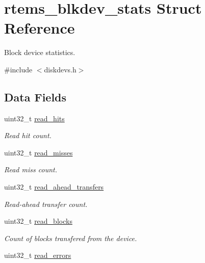 \hypertarget{structrtems__blkdev__stats}{}\section{rtems\+\_\+blkdev\+\_\+stats Struct Reference}
\label{structrtems__blkdev__stats}


Block device statistics.  




{\ttfamily \#include $<$diskdevs.\+h$>$}

\subsection*{Data Fields}
\begin{DoxyCompactItemize}
\item 
uint32\+\_\+t \mbox{\hyperlink{structrtems__blkdev__stats_af736623d6402bae1d180e1f896aed6be}{read\+\_\+hits}}
\begin{DoxyCompactList}\small\item\em Read hit count. \end{DoxyCompactList}\item 
uint32\+\_\+t \mbox{\hyperlink{structrtems__blkdev__stats_ad68da4f36c9175bba1d07183d83babc3}{read\+\_\+misses}}
\begin{DoxyCompactList}\small\item\em Read miss count. \end{DoxyCompactList}\item 
uint32\+\_\+t \mbox{\hyperlink{structrtems__blkdev__stats_a1102468f161fcfff77623d38211073d5}{read\+\_\+ahead\+\_\+transfers}}
\begin{DoxyCompactList}\small\item\em Read-\/ahead transfer count. \end{DoxyCompactList}\item 
\mbox{\label{structrtems__blkdev__stats_a1320cb54e2797ad76c40728597856dc2}} 
uint32\+\_\+t \mbox{\hyperlink{structrtems__blkdev__stats_a1320cb54e2797ad76c40728597856dc2}{read\+\_\+blocks}}
\begin{DoxyCompactList}\small\item\em Count of blocks transfered from the device. \end{DoxyCompactList}\item 
uint32\+\_\+t \mbox{\hyperlink{structrtems__blkdev__stats_a309a8576315f9ee5785d1b3a5c29c123}{read\+\_\+errors}}

\end{DoxyCompactItemize}
